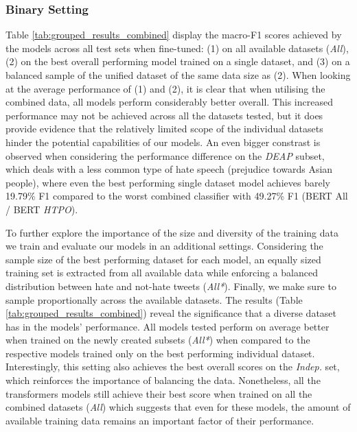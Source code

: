 \subsubsection{Binary Setting}
Table \ref{tab:grouped_results_combined} display the macro-F1 scores achieved by the models across all test sets when fine-tuned: (1) on all available datasets (\textit{All}), (2) on the best overall performing model trained on a single dataset, and (3) on a balanced sample of the unified dataset of the same data size as (2). When looking at the average performance of (1) and (2), it is clear that when utilising the combined data, all models perform considerably better overall. %
This increased performance may not be achieved across all the datasets tested, but it does provide evidence that the relatively limited scope of the individual datasets hinder the potential capabilities of our models. An even bigger constrast is observed when considering the performance difference on the \textit{DEAP} subset, which deals with a less common type of hate speech (prejudice towards Asian people),  where even the best performing single dataset model achieves barely 19.79\% F1 compared to the worst combined classifier with 49.27\% F1 (BERT All / BERT \textit{HTPO}).

To further explore the importance of the size and diversity of the training data we train and evaluate our models in an additional settings. Considering the sample size of the best performing dataset for each model, an equally sized training set is extracted from all available data while enforcing a balanced distribution between hate and not-hate tweets (\textit{All*}). Finally, we make sure to sample proportionally across the available datasets.
The results (Table \ref{tab:grouped_results_combined}) reveal the significance that a diverse dataset has in the models' performance. All models tested perform on average better when trained on the newly created subsets (\textit{All*}) when compared to the respective models trained only on the best performing individual dataset. Interestingly, this setting also achieves the best overall scores on the \textit{Indep.} set, which reinforces the importance of balancing the data. 
Nonetheless, all the transformers models still achieve their best score when trained on all the combined datasets (\textit{All}) which suggests that even for these models, the amount of available training data remains an important factor of their performance.


